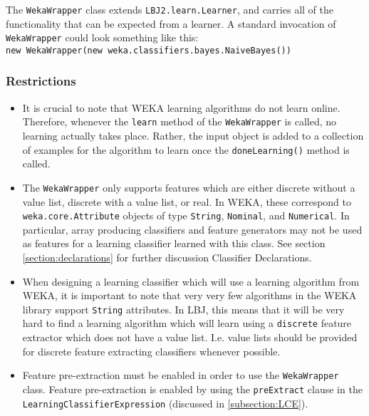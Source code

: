 The {\tt WekaWrapper} class extends {\tt LBJ2.learn.Learner}, and carries all
of the functionality that can be expected from a learner.  A standard
invocation of {\tt WekaWrapper} could look something like this: \\

{\tt new WekaWrapper(new weka.classifiers.bayes.NaiveBayes())} 

\subsubsection*{Restrictions}
\begin{itemize}

\item
  It is crucial to note that WEKA learning algorithms do not learn online.
  Therefore, whenever the {\tt learn} method of the {\tt WekaWrapper} is
  called, no learning actually takes place.  Rather, the input object is added
  to a collection of examples for the algorithm to learn once the
  {\tt doneLearning()} method is called.

\item
  The {\tt WekaWrapper} only supports features which are either discrete
  without a value list, discrete with a value list, or real.  In WEKA, these
  correspond to {\tt weka.core.Attribute} objects of type {\tt String},
  {\tt Nominal}, and {\tt Numerical}.  In particular, array producing
  classifiers and feature generators may not be used as features for a
  learning classifier learned with this class.  See section
  \ref{section:declarations} for further discussion Classifier Declarations.

\item
  When designing a learning classifier which will use a learning algorithm
  from WEKA, it is important to note that very very few algorithms in the WEKA
  library support {\tt String} attributes.  In LBJ, this means that it will be
  very hard to find a learning algorithm which will learn using a
  {\tt discrete} feature extractor which does not have a value list.  I.e.
  value lists should be provided for discrete feature extracting classifiers
  whenever possible. 

\item
  Feature pre-extraction must be enabled in order to use the {\tt WekaWrapper}
  class.  Feature pre-extraction is enabled by using the {\tt preExtract}
  clause in the {\tt LearningClassifierExpression} (discussed in
  \ref{subsection:LCE}).

\end{itemize}


